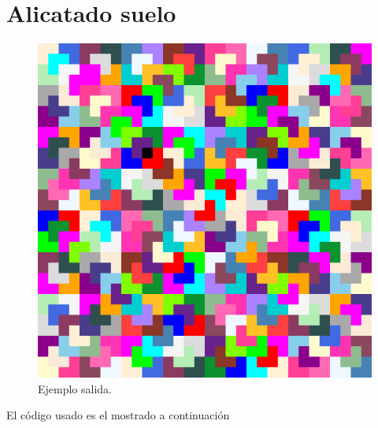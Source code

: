 \section{Alicatado suelo}
\begin{figure}[H]
    \begin{center}
        \includegraphics[scale=0.5]{imagenes/test.png}
        \caption{Ejemplo salida.}
        \label{fig2}
    \end{center}
\end{figure}

El código usado es el mostrado a continuación

